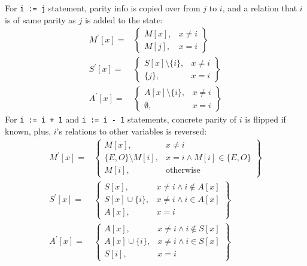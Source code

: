 For \texttt{i := j} statement, parity info is copied over from $j$ to $i$, and a relation that $i$ is of same parity as $j$ is added to the state:
\begin{align*}
M^\prime[x] = & \left.
	\begin{cases}
		M[x], & x\ne i \\
		M[j], & x = i
	\end{cases}
\right\}\\
S^\prime[x] = & \left.
	\begin{cases}
		S[x] \setminus \{i\}, & x\ne i \\
		\{j\}, & x = i
	\end{cases}
\right\}\\
A^\prime[x] = & \left.
\begin{cases}
	A[x] \setminus \{i\}, & x\ne i \\
	\emptyset, & x = i
\end{cases}
\right\}
\end{align*}
For \texttt{i := i + 1} and \texttt{i := i - 1} statements, concrete parity of $i$ is flipped if known, plus, $i$'s relations to other variables is reversed:
\begin{align*}
M^\prime[x] = & \left.
	\begin{cases}
		M[x], & x\ne i \\
		\{E, O\} \setminus M[i], & x = i \wedge M[i] \in \{E, O\} \\
		M[i], & \text{otherwise}
	\end{cases}
\right\}\\
S^\prime[x] = & \left.
	\begin{cases}
		S[x], & x\ne i \wedge i \notin A[x]\\
		S[x] \cup \{i\}, & x\ne i \wedge i \in A[x]\\
		A[x], & x = i
	\end{cases}
\right\}\\
A^\prime[x] = & \left.
	\begin{cases}
		A[x], & x\ne i \wedge i \notin S[x]\\
		A[x] \cup \{i\}, & x\ne i \wedge i \in S[x]\\
		S[i], & x = i
	\end{cases}
\right\}
\end{align*}


